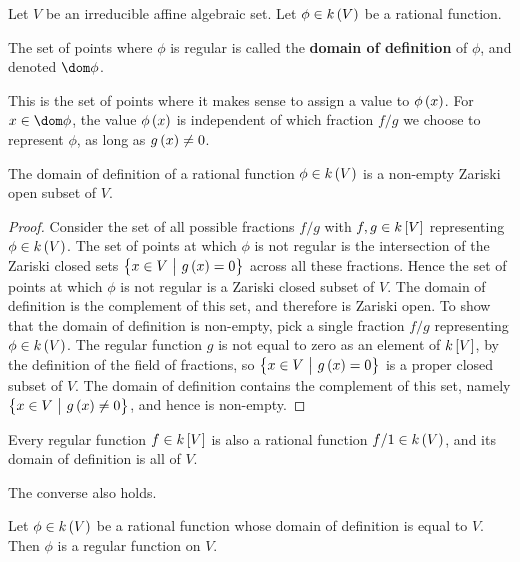 
Let $ V $ be an irreducible affine algebraic set. Let $ \phi \in k\br{V} $ be a rational function.

\begin{definition*}
The set of points where $ \phi $ is regular is called the \textbf{domain of definition} of $ \phi $, and denoted $ \dom \phi $.
\end{definition*}

This is the set of points where it makes sense to assign a value to $ \phi\br{x} $. For $ x \in \dom \phi $, the value $ \phi\br{x} $ is independent of which fraction $ f / g $ we choose to represent $ \phi $, as long as $ g\br{x} \ne 0 $.

\begin{lemma}
The domain of definition of a rational function $ \phi \in k\br{V} $ is a non-empty Zariski open subset of $ V $.
\end{lemma}

\begin{proof}
Consider the set of all possible fractions $ f / g $ with $ f, g \in k\sbr{V} $ representing $ \phi \in k\br{V} $. The set of points at which $ \phi $ is not regular is the intersection of the Zariski closed sets $ \cbr{x \in V \st g\br{x} = 0} $ across all these fractions. Hence the set of points at which $ \phi $ is not regular is a Zariski closed subset of $ V $. The domain of definition is the complement of this set, and therefore is Zariski open. To show that the domain of definition is non-empty, pick a single fraction $ f / g $ representing $ \phi \in k\br{V} $. The regular function $ g $ is not equal to zero as an element of $ k\sbr{V} $, by the definition of the field of fractions, so $ \cbr{x \in V \st g\br{x} = 0} $ is a proper closed subset of $ V $. The domain of definition contains the complement of this set, namely $ \cbr{x \in V \st g\br{x} \ne 0} $, and hence is non-empty.
\end{proof}

\begin{note*}
Every regular function $ f \in k\sbr{V} $ is also a rational function $ f / 1 \in k\br{V} $, and its domain of definition is all of $ V $.
\end{note*}

\pagebreak

The converse also holds.

\begin{lemma}
Let $ \phi \in k\br{V} $ be a rational function whose domain of definition is equal to $ V $. Then $ \phi $ is a regular function on $ V $.
\end{lemma}

